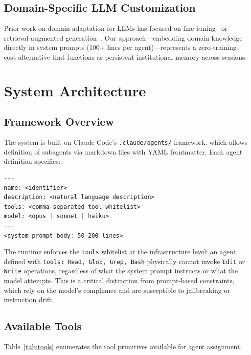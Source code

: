 \documentclass[11pt,a4paper]{article}
\begin{document}
\subsection{Domain-Specific LLM Customization}

Prior work on domain adaptation for LLMs has focused on fine-tuning~\cite{gururangan2020} or retrieval-augmented generation~\cite{lewis2020}. Our approach---embedding domain knowledge directly in system prompts (100+ lines per agent)---represents a zero-training-cost alternative that functions as persistent institutional memory across sessions.

\section{System Architecture}

\subsection{Framework Overview}

The system is built on Claude Code's \texttt{.claude/agents/} framework, which allows definition of subagents via markdown files with YAML frontmatter. Each agent definition specifies:

\begin{lstlisting}[caption={Agent definition schema}]
---
name: <identifier>
description: <natural language description>
tools: <comma-separated tool whitelist>
model: <opus | sonnet | haiku>
---
<system prompt body: 50-200 lines>
\end{lstlisting}

The runtime enforces the \texttt{tools} whitelist at the infrastructure level: an agent defined with \texttt{tools: Read, Glob, Grep, Bash} physically cannot invoke \texttt{Edit} or \texttt{Write} operations, regardless of what the system prompt instructs or what the model attempts. This is a critical distinction from prompt-based constraints, which rely on the model's compliance and are susceptible to jailbreaking or instruction drift.

\subsection{Available Tools}

Table~\ref{tab:tools} enumerates the tool primitives available for agent assignment.
\end{document}

